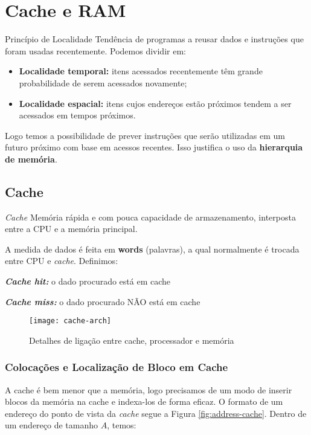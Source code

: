 \chapter{Cache e RAM}

\begin{definicao}{Princípio de Localidade}
  Tendência de programas a reusar dados e instruções que foram usadas recentemente. Podemos dividir em:

  \begin{itemize}
    \item \textbf{Localidade temporal:} itens acessados recentemente têm grande probabilidade de serem acessados novamente;

    \item \textbf{Localidade espacial:} itens cujos endereços estão próximos tendem a ser acessados em tempos próximos.
  \end{itemize}
\end{definicao}


Logo temos a possibilidade de prever instruções que serão utilizadas em um futuro próximo com base em acessos recentes. Isso justifica o uso da \textbf{hierarquia de memória}.


\section{Cache}
\begin{definicao}{\textit{Cache}}
  Memória rápida e com pouca capacidade de armazenamento, interposta entre a CPU e a memória principal.
\end{definicao}

A medida de dados é feita em \textbf{words} (palavras), a qual normalmente é trocada entre CPU e \textit{cache}. Definimos:

\textbf{\textit{Cache hit:}} o dado procurado está em cache

\textbf{\textit{Cache miss:}} o dado procurado NÃO está em cache

\begin{figure}[ht]
  \centering
  \texttt{[image: cache-arch]}
  \label{fig:cache-arc}
  \caption{Detalhes de ligação entre cache, processador e memória}
\end{figure}

\subsection{Colocações e Localização de Bloco em Cache}
A cache é bem menor que a memória, logo precisamos de um modo de inserir blocos da memória na cache e indexa-los de forma eficaz. O formato de um endereço do ponto de vista da \textit{cache} segue a Figura \ref{fig:address-cache}. Dentro de um endereço de tamanho $A$, temos:

